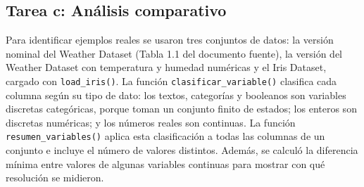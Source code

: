 \documentclass[11pt,letterpaper]{article}
\begin{document}
\subsection{Tarea c: Análisis comparativo}

Para identificar ejemplos reales se usaron tres conjuntos de datos: la versión nominal del Weather Dataset (Tabla 1.1 del documento fuente), la versión del Weather Dataset con temperatura y humedad numéricas \parencite{witten2017} y el Iris Dataset, cargado con \texttt{load\_iris()}. La función \texttt{clasificar\_variable()} clasifica cada columna según su tipo de dato: los textos, categorías y booleanos son variables discretas categóricas, porque toman un conjunto finito de estados; los enteros son discretas numéricas; y los números reales son continuas. La función \texttt{resumen\_variables()} aplica esta clasificación a todas las columnas de un conjunto e incluye el número de valores distintos. Además, se calculó la diferencia mínima entre valores de algunas variables continuas para mostrar con qué resolución se midieron.
\end{document}
